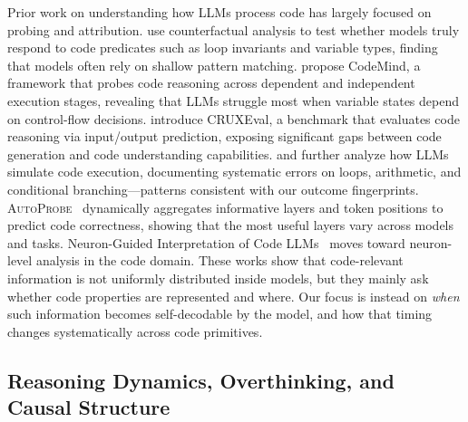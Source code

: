 Prior work on understanding how LLMs process code has largely focused on probing and attribution.
\citet{hooda2024counterfactual} use counterfactual analysis to test whether models truly respond to code predicates such as loop invariants and variable types, finding that models often rely on shallow pattern matching.
\citet{liu2024codemind} propose CodeMind, a framework that probes code reasoning across dependent and independent execution stages, revealing that LLMs struggle most when variable states depend on control-flow decisions.
\citet{gu2024cruxeval} introduce CRUXEval, a benchmark that evaluates code reasoning via input/output prediction, exposing significant gaps between code generation and code understanding capabilities.
\citet{chen2025reval} and \citet{abdollahi2025demystifying} further analyze how LLMs simulate code execution, documenting systematic errors on loops, arithmetic, and conditional branching---patterns consistent with our outcome fingerprints.
\textsc{AutoProbe}~\citep{autoprobe2025} dynamically aggregates informative layers and token positions to predict code correctness, showing that the most useful layers vary across models and tasks.
Neuron-Guided Interpretation of Code LLMs~\citep{neuronguided2026} moves toward neuron-level analysis in the code domain.
These works show that code-relevant information is not uniformly distributed inside models, but they mainly ask whether code properties are represented and where.
Our focus is instead on \emph{when} such information becomes self-decodable by the model, and how that timing changes systematically across code primitives.

\subsection{Reasoning Dynamics, Overthinking, and Causal Structure}

